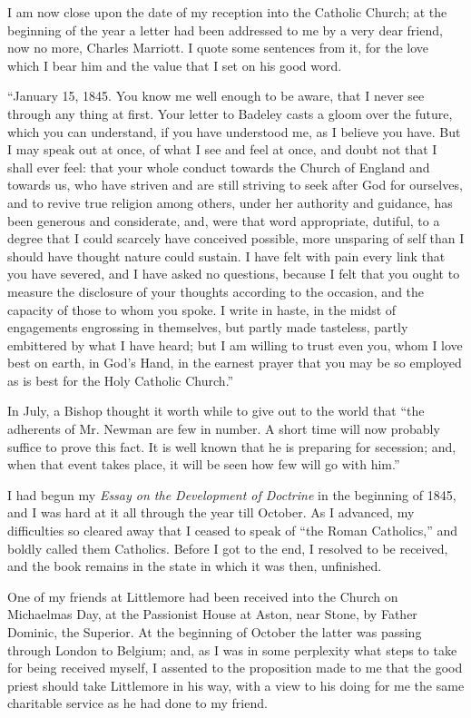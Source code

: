 I am now close upon the date of my reception into the Catholic
Church; at the beginning of the year a letter had been addressed to me by a very dear friend, now
no more, Charles Marriott. I quote some sentences from it, for the love which I bear him
and the value that I set on his good word.

``January 15, 1845. You know me well enough to be aware, that
I never see through any thing at first. Your letter to Badeley casts a
gloom over the future, which you can understand, if you have understood
me, as I believe you have. But I may speak out at once, of what I see
and feel at once, and doubt not that I shall ever feel: that your whole
conduct towards the Church of England and towards us, who have striven
and are still striving to seek after God for ourselves, and to revive
true religion among others, under her authority and guidance, has been
generous and considerate, and, were that word appropriate, dutiful, to a
degree that I could scarcely have conceived possible, more unsparing of
self than I should have thought nature could sustain. I have felt with
pain every link that you have severed, and I have asked no questions,
because I felt that you ought to measure the disclosure of your thoughts
according to the occasion, and the capacity of those to whom you spoke.
I write in haste, in the midst of engagements engrossing in
themselves, but partly made tasteless, partly embittered by what I have
heard; but I am willing to trust even you, whom I love best on earth, in
God's Hand, in the earnest prayer that you may be so employed as is best
for the Holy Catholic Church.''

In July, a Bishop thought it worth while to give out to the world that
``the adherents of Mr. Newman are few in number. A short time will
now probably suffice to prove this fact. It is well known that he is
preparing for secession; and, when that event takes place, it will be
seen how few will go with him.''

I had begun my \emph{Essay on the Development of Doctrine} in the
beginning of 1845, and I was hard
at it all through the year till October. As I advanced, my difficulties so
cleared away that I ceased to speak of ``the Roman
Catholics,'' and boldly called them Catholics. Before I got to the
end, I resolved to be received, and the book remains in the state in
which it was then, unfinished.

One of my friends at Littlemore had been received into the Church
on Michaelmas Day, at the Passionist House at Aston, near Stone, by
Father Dominic, the Superior. At the beginning of October the latter was
passing through London to Belgium; and, as I was in some perplexity what
steps to take for being received myself, I assented to the proposition
made to me that the good priest should take Littlemore in his way, with
a view to his doing for me the same charitable service as he had done to
my friend.

